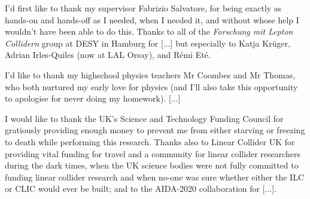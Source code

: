 
I'd first like to thank my supervisor Fabrizio Salvatore, for being exactly as hands-on and hands-off as I needed, when I needed it, and without whose help I wouldn't have been able to do this. Thanks to all of the \emph{Forschung mit Lepton Collidern} group at DESY in Hamburg for [...] but especially to Katja Kr\"{u}ger, Adrian Irles-Quiles (now at LAL Orsay), and R\'{e}mi Et\'{e}.

I'd like to thank my highschool physics teachers Mr Coombes and Mr Thomas, who both nurtured my early love for physics (and I'll also take this opportunity to apologise for never doing my homework). [...] 

I would like to thank the UK's Science and Technology Funding Council for gratiously providing enough money to prevent me from either starving or freezing to death while performing this research. Thanks also to Linear Collider UK for providing vital funding for travel and a community for linear collider researchers during the dark times, when the UK science bodies were not fully committed to funding linear collider research and when no-one was sure whether either the ILC or CLIC would ever be built; and to the AIDA-2020 collaboration for [...].
